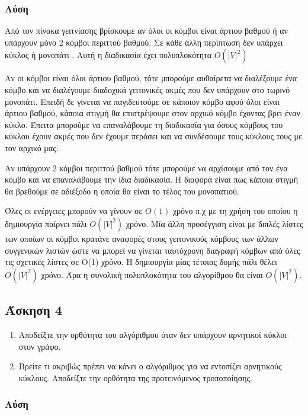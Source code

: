 \documentclass{assignment}
\begin{document}
\subsubsection*{Λύση}
Από τον πίνακα γειτνίασης βρίσκουμε αν όλοι οι κόμβοι είναι άρτιου
βαθμού ή αν υπάρχουν μόνο 2 κόμβοι περιττού βαθμού. Σε κάθε άλλη περίπτωση
δεν υπάρχει κύκλος ή μονοπάτι . Αυτή η διαδικασία έχει
πολυπλοκότητα $O(|V|^2)$ 

Αν οι κόμβοι είναι όλοι άρτιου 
βαθμού, τότε μπορούμε αυθαίρετα να διαλέξουμε ένα κόμβο και να διαλέγουμε
διαδοχικά γειτονικές ακμές που δεν υπάρχουν στο τωρινό μονοπάτι. Επειδή δε
γίνεται να παγιδευτούμε σε κάποιον κόμβο αφού όλοι είναι άρτιου βαθμού,
κάποια στιγμή θα επιστρέψουμε στον αρχικό κόμβο έχοντας βρει έναν κύκλο.
Έπειτα μπορούμε να επαναλάβουμε τη διαδικασία για όσους κόμβους του
κύκλου έχουν ακμές που δεν έχουμε περάσει και να συνδέσουμε τους κύκλους
τους με τον αρχικό μας. 

Αν υπάρχουν 2 κόμβοι περιττού βαθμού τότε μπορούμε να αρχίσουμε από
τον ένα κόμβο και να επαναλάβουμε την ίδια διαδικασία. Η διαφορά είναι
πως κάποια στιγμή θα βρεθούμε σε αδιέξοδο η οποία θα είναι το τέλος
του μονοπατιού. 

Όλες οι ενέργειες μπορούν να γίνουν σε $O(1)$ χρόνο π.χ με τη χρήση
 του οποίου η δημιουργία παίρνει πάλι $O(|V|^2)$ χρόνο. 
Μία άλλη προσέγγιση είναι με διπλές λίστες των οποίων οι κόμβοι κρατάνε
αναφορές στους γειτονικούς κόμβους των άλλων συγγενικών λιστών ώστε 
να μπορεί να γίνεται ταυτόχρονη διαγραφή κόμβων από όλες τις σχετικές
λίστες σε O(1) χρόνο. Η δημιουργία μίας τέτοιας δομής πάλι θέλει $O(|V|^2)$
χρόνο. 
Άρα η συνολική πολυπλοκότητα του αλγορίθμου θα είναι $O(|V|^2)$.
 

\newpage\subsection*{Άσκηση 4}
\begin{enumerate}
\item
Αποδείξτε την ορθότητα του αλγόριθμου  όταν δεν υπάρχουν 
αρνητικοί κύκλοι στον γράφο.

\item
Βρείτε τι ακριβώς πρέπει να κάνει ο αλγόριθμος  για
να εντοπίζει αρνητικούς κύκλους. Αποδείξτε την ορθότητα της προτεινόμενος
τροποποίησης.
\end{enumerate}

\subsubsection*{Λύση}
\end{document}
